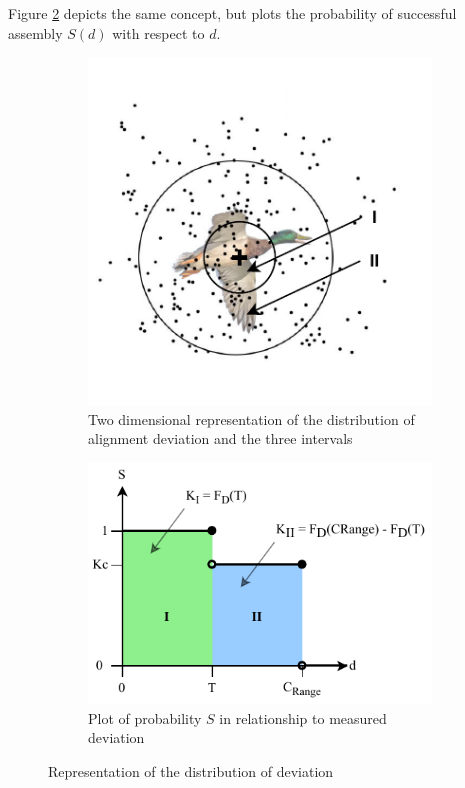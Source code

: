 Figure \ref{fig:distribution-of-alignment-points-graph} depicts the same concept, but plots the probability of successful assembly $S(d)$ with respect to $d$.

\begin{figure}[ht]
    \centering
    \begin{subfigure}[b]{0.49\textwidth}
        \centering
        \includegraphics[width=\textwidth]{images/09/Hit Goose.pdf}
        \caption{Two dimensional representation of the distribution of alignment deviation and the three intervals}
        \label{fig:distribution-of-alignment-points-goose}
    \end{subfigure}
    \hfill
    \begin{subfigure}[b]{0.49\textwidth}
        \centering
        \includegraphics[width=\textwidth]{images/09/Probability Plot Two Interval.pdf}
        \caption{Plot of probability $S$ in relationship to measured deviation}
        \label{fig:distribution-of-alignment-points-graph}
    \end{subfigure}
    \caption{Representation of the distribution of deviation}
    \label{fig:distribution-of-alignment-points}
\end{figure}

